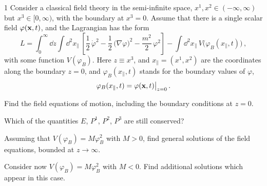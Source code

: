 \begin{hwproblem}{1}\label{hw:1}
Consider a classical field theory in the semi-infinite space,
$x^1,x^2\in(-\infty,\infty)$ but $x^3\in[0,\infty)$, with the boundary at
$x^3=0$. Assume that there is a single scalar field $\varphi(\mathbf{x},t)$, and the
Lagrangian has the form
\[
L=\int_0^\infty \dd z\int \dd^2x_\parallel\,\left[\frac12\,\dot\varphi^2-\frac12\,\bigl(\nabla\varphi\bigr)^2-\frac{m^2}{2}\,\varphi^2\right]
-\int \dd^2x_\parallel\,V\bigl(\varphi_B(x_\parallel,t)\bigr)\,,
\]
with some function $V(\varphi_B)$. Here $z\equiv x^3$, and
$x_\parallel=(x^1,x^2)$ are the coordinates along the boundary $z=0$, and
$\varphi_B(x_\parallel,t)$ stands for the boundary values of $\varphi$,
\[
\varphi_B(x_\parallel,t)=\varphi(\mathbf{x},t)\big|_{z=0}\,.
\]
\begin{hwparts}
\item Find the field equations of motion, including the boundary conditions
at $z=0$.
\item Which of the quantities $E$, $P^1$, $P^2$, $P^3$ are still conserved?
\item Assuming that $V(\varphi_B)=M\varphi_B^2$ with $M>0$, find general
solutions of the field equations, bounded at $z\to\infty$.
\item Consider now $V(\varphi_B)=M\varphi_B^2$ with $M<0$. Find additional
solutions which appear in this case.
\end{hwparts}
\end{hwproblem}

